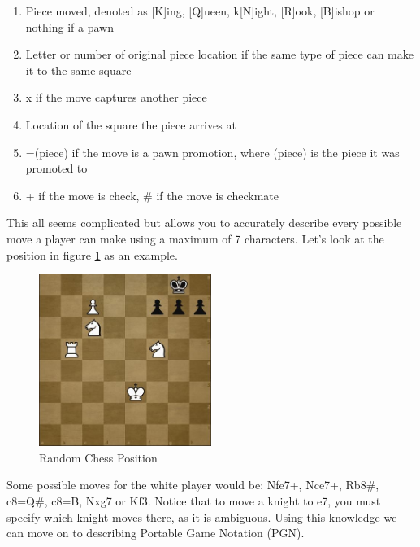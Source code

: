 \documentclass[12pt]{article}
\begin{document}
    \begin{enumerate}
        \item Piece moved, denoted as [K]ing, [Q]ueen, k[N]ight, [R]ook, [B]ishop or nothing if a pawn
        \item Letter or number of original piece location if the same type of piece can make it to the same square
        \item x if the move captures another piece 
        \item Location of the square the piece arrives at 
        \item =(piece) if the move is a pawn promotion, where (piece) is the piece it was promoted to
        \item + if the move is check, \# if the move is checkmate 
    \end{enumerate}

    This all seems complicated but allows you to accurately describe every possible move a player can make using a maximum of 7 characters. Let's look at the position in figure \ref{fig:chess_position} as an example. 

    \begin{singlespace}
        \begin{figure}[ht]
            \centering
            \caption{Random Chess Position}
            \label{fig:chess_position}
            \includegraphics[width=0.5\textwidth]{random_position.jpg}
        \end{figure}
    \end{singlespace}

    Some possible moves for the white player would be: Nfe7+, Nce7+, Rb8\#, c8=Q\#, c8=B, Nxg7 or Kf3. Notice that to move a knight to e7, you must specify which knight moves there, as it is ambiguous. Using this knowledge we can move on to describing Portable Game Notation (PGN).
\end{document}
